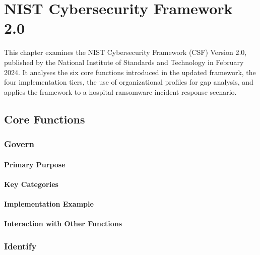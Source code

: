 
\chapter{NIST Cybersecurity Framework 2.0}

This chapter examines the NIST Cybersecurity Framework (CSF) Version 2.0, published by the National Institute of Standards and Technology in February 2024. It analyses the six core functions introduced in the updated framework, the four implementation tiers, the use of organizational profiles for gap analysis, and applies the framework to a hospital ransomware incident response scenario.

\section{Core Functions}

\subsection{Govern}

\subsubsection{Primary Purpose}

\subsubsection{Key Categories}



\subsubsection{Implementation Example}

\subsubsection{Interaction with Other Functions}


\subsection{Identify}

